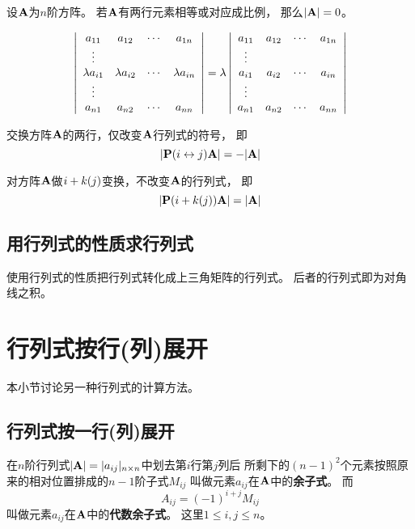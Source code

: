 \begin{theorem}
  设$\mmA$为$n$阶方阵。
  若$\mmA$有两行元素相等或对应成比例，
  那么$|\mmA| = 0$。
\end{theorem}

\begin{theorem}
  \begin{displaymath}
    \mdet{cccc}{
      a_{11} & a_{12} & \cdots & a_{1n} \\
      \vdots &        &        &        \\
      \lambda a_{i1} & \lambda a_{i2} & \cdots & \lambda a_{in} \\
      \vdots &        &        &        \\
      a_{n1} & a_{n2} & \cdots & a_{nn} }
    = \lambda \mdet{cccc}{
      a_{11} & a_{12} & \cdots & a_{1n} \\
      \vdots &        &        &        \\
      a_{i1} & a_{i2} & \cdots & a_{in} \\
      \vdots &        &        &        \\
      a_{n1} & a_{n2} & \cdots & a_{nn} }
  \end{displaymath}
\end{theorem}

\begin{theorem} \label{thrm-det-rowswi}
  交换方阵$\mmA$的两行，仅改变$\mmA$行列式的符号，
  即\[ |\mmRowSwi{i}{j}\mmA| = -|\mmA| \]
\end{theorem}

\begin{theorem} \label{thrm-det-rowadd}
  对方阵$\mmA$做$\mTfRowAdd{i}{+k}{j}$变换，不改变$\mmA$的行列式，
  即\[ |\mmRowAdd{i}{+k}{j}\mmA| = |\mmA| \]
\end{theorem}

\subsection{用行列式的性质求行列式}
使用行列式的性质把行列式转化成上三角矩阵的行列式。
后者的行列式即为对角线之积。

\section{行列式按行(列)展开}
本小节讨论另一种行列式的计算方法。

\subsection{行列式按一行(列)展开}
\begin{definition}[余子式]
  在$n$阶行列式$|\mmA|=|a_{ij}|_{n\times n}$中划去第$i$行第$j$列后
  所剩下的$(n-1)^2$个元素按照原来的相对位置排成的$n-1$阶子式$M_{ij}$
  叫做元素$a_{ij}$在$\mmA$中的\textbf{余子式}。
  而\[ A_{ij} = (-1)^{i+j}M_{ij} \]
  叫做元素$a_{ij}$在$\mmA$中的\textbf{代数余子式}。
  这里$1\le i, j \le n$。
\end{definition}

